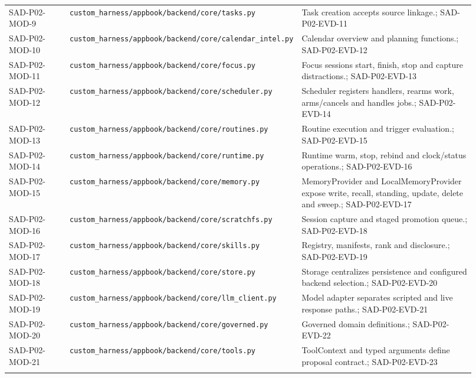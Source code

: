 \documentclass[10pt,letterpaper]{article}
\begin{document}
\begin{longtable}{@{}>{\raggedright\arraybackslash}p{0.15\linewidth}>{\raggedright\arraybackslash}p{0.34\linewidth}>{\raggedright\arraybackslash}p{0.43\linewidth}@{}}
SAD-P02-MOD-9 & \nolinkurl{custom_harness/appbook/backend/core/tasks.py} & Task creation accepts source linkage.; SAD-P02-EVD-11\\\addlinespace
SAD-P02-MOD-10 & \nolinkurl{custom_harness/appbook/backend/core/calendar_intel.py} & Calendar overview and planning functions.; SAD-P02-EVD-12\\\addlinespace
SAD-P02-MOD-11 & \nolinkurl{custom_harness/appbook/backend/core/focus.py} & Focus sessions start, finish, stop and capture distractions.; SAD-P02-EVD-13\\\addlinespace
SAD-P02-MOD-12 & \nolinkurl{custom_harness/appbook/backend/core/scheduler.py} & Scheduler registers handlers, rearms work, arms/cancels and handles jobs.; SAD-P02-EVD-14\\\addlinespace
SAD-P02-MOD-13 & \nolinkurl{custom_harness/appbook/backend/core/routines.py} & Routine execution and trigger evaluation.; SAD-P02-EVD-15\\\addlinespace
SAD-P02-MOD-14 & \nolinkurl{custom_harness/appbook/backend/core/runtime.py} & Runtime warm, stop, rebind and clock/status operations.; SAD-P02-EVD-16\\\addlinespace
SAD-P02-MOD-15 & \nolinkurl{custom_harness/appbook/backend/core/memory.py} & MemoryProvider and LocalMemoryProvider expose write, recall, standing, update, delete and sweep.; SAD-P02-EVD-17\\\addlinespace
SAD-P02-MOD-16 & \nolinkurl{custom_harness/appbook/backend/core/scratchfs.py} & Session capture and staged promotion queue.; SAD-P02-EVD-18\\\addlinespace
SAD-P02-MOD-17 & \nolinkurl{custom_harness/appbook/backend/core/skills.py} & Registry, manifests, rank and disclosure.; SAD-P02-EVD-19\\\addlinespace
SAD-P02-MOD-18 & \nolinkurl{custom_harness/appbook/backend/core/store.py} & Storage centralizes persistence and configured backend selection.; SAD-P02-EVD-20\\\addlinespace
SAD-P02-MOD-19 & \nolinkurl{custom_harness/appbook/backend/core/llm_client.py} & Model adapter separates scripted and live response paths.; SAD-P02-EVD-21\\\addlinespace
SAD-P02-MOD-20 & \nolinkurl{custom_harness/appbook/backend/core/governed.py} & Governed domain definitions.; SAD-P02-EVD-22\\\addlinespace
SAD-P02-MOD-21 & \nolinkurl{custom_harness/appbook/backend/core/tools.py} & ToolContext and typed arguments define proposal contract.; SAD-P02-EVD-23\\\addlinespace

\end{longtable}
\end{document}
